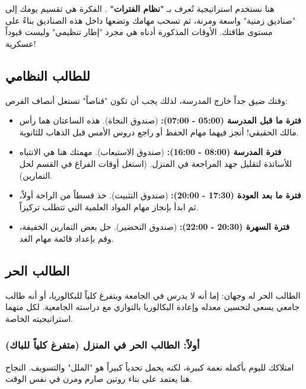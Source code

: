 \documentclass[12pt,a4paper]{book}
\begin{document}
	هنا نستخدم استراتيجية تُعرف بـ \textbf{"نظام الفترات" }. الفكرة هي تقسيم يومك إلى "صناديق زمنية" واسعة ومرنة، ثم تسحب مهامك وتضعها داخل هذه الصناديق بناءً على مستوى طاقتك. الأوقات المذكورة أدناه هي مجرد "إطار تنظيمي" وليست قيوداً عسكرية!
	\subsection{للطالب النظامي}
	وقتك ضيق جداً خارج المدرسة، لذلك يجب أن تكون "قناصاً" تستغل أنصاف الفرص:
	\begin{itemize}
		\item \textbf{فترة ما قبل المدرسة (05:00 - 07:00):} (صندوق النجاة). هذه الساعتان هما رأس مالك الحقيقي! أنجز فيهما مهام الحفظ أو راجع دروس الأمس قبل الذهاب للثانوية.
		\item \textbf{فترة المدرسة (08:00 - 16:00):} (صندوق الاستيعاب). مهمتك هنا هي الانتباه للأساتذة لتقليل جهد المراجعة في المنزل. (استغل أوقات الفراغ في القسم لحل التمارين).
		\item \textbf{فترة ما بعد العودة (17:30 - 20:00):} (صندوق التثبيت). خذ قسطاً من الراحة أولاً، ثم ابدأ بإنجاز مهام المواد العلمية التي تتطلب تركيزاً.
		\item \textbf{فترة السهرة (20:30 - 22:00):} (صندوق التحضير). حل بعض التمارين الخفيفة، وقم بإعداد قائمة مهام الغد.
	\end{itemize}
	
	\subsection{الطالب الحر}
	
	الطالب الحر له وجهان: إما أنه لا يدرس في الجامعة ويتفرغ كلياً للبكالوريا، أو أنه طالب جامعي يسعى لتحسين معدله وإعادة البكالوريا بالتوازي مع دراسته الجامعية. لكل منهما استراتيجيته الخاصة.
	
	\subsubsection{أولاً: الطالب الحر في المنزل (متفرغ كلياً للباك)}
	
	امتلاكك لليوم بأكمله نعمة كبيرة، لكنه يحمل تحدياً كبيراً هو "الملل" والتسويف. النجاح هنا يعتمد على بناء روتين صارم ومرن في نفس الوقت.
	
\end{document}
